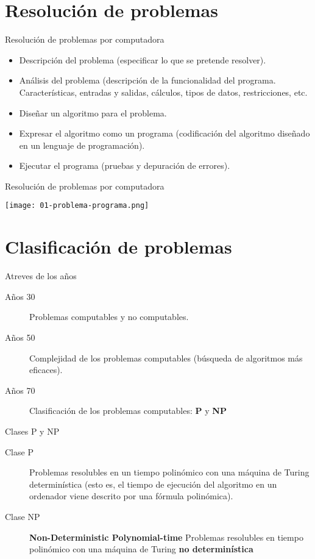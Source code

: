 \section{Resolución de problemas}

\begin{frame}[c]{Resolución de problemas por computadora}
  \begin{itemize}
    \item Descripción del problema (especificar lo que se pretende resolver).
    \item Análisis del problema (descripción de la funcionalidad del programa.
      Características, entradas y salidas, cálculos, tipos de datos,
      restricciones, etc.
    \item Diseñar un algoritmo para el problema.
    \item Expresar el algoritmo como un programa (codificación del algoritmo
      diseñado en un lenguaje de programación).
    \item Ejecutar el programa (pruebas y depuración de errores).
  \end{itemize}
\end{frame}

\begin{frame}[c]{Resolución de problemas por computadora}
  \begin{center}
    \texttt{[image: 01-problema-programa.png]}
  \end{center}
\end{frame}

\section{Clasificación de problemas}

\begin{frame}[c]{Atreves de los años}
  \begin{description}
    \item[Años 30] Problemas computables y no computables.
    \item[Años 50] Complejidad de los problemas computables (búsqueda de
      algoritmos más eficaces).
    \item[Años 70] Clasificación de los problemas computables: \textbf{P}
      y \textbf{NP}
  \end{description}
\end{frame}

\begin{frame}[c]{Clases P y NP}
  \begin{description}
    \item[Clase P] Problemas resolubles en un tiempo polinómico con una máquina
      de Turing determinística (esto es, el tiempo de ejecución del algoritmo en
      un ordenador viene descrito por una fórmula polinómica).
    \item[Clase NP] \textbf{Non-Deterministic Polynomial-time} Problemas
      resolubles en tiempo polinómico con una máquina de Turing \textbf{no
      determinística}
  \end{description}
\end{frame}

